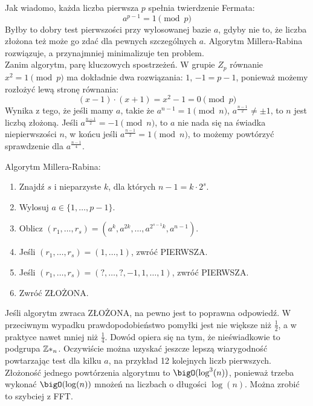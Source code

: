 Jak wiadomo, każda liczba pierwsza \( p \) spełnia twierdzenie Fermata: \[ a^{p-1} = 1 \pmod{p} \] Byłby to dobry test pierwszości przy wylosowanej bazie \( a \), gdyby nie to, że liczba złożona też może go zdać dla pewnych szczególnych \( a \). Algorytm Millera-Rabina rozwiązuje, a przynajmniej minimalizuje ten problem. \\
Zanim algorytm, parę kluczowych spostrzeżeń. W grupie \( Z_p \) równanie \( x^2 = 1 \pmod{p} \) ma dokładnie dwa rozwiązania: \( 1 \), \( -1 = p - 1 \), ponieważ możemy rozłożyć lewą stronę równania: \[ (x-1) \cdot (x+1) = x^2 - 1 = 0 \pmod{p} \] Wynika z tego, że jeśli mamy \( a \), takie że \( a^{n-1} = 1 \pmod{n} \), \( a^{\frac{n-1}{2}} \neq \pm 1 \), to \( n \) jest liczbą złożoną. Jeśli \( a^{\frac{n-1}{2}} = -1 \pmod{n} \), to \( a \) nie nada się na świadka niepierwszości \( n \), w końcu jeśli \( a^{\frac{n-1}{2}} = 1 \pmod{n} \), to możemy powtórzyć sprawdzenie dla \( a^{\frac{n-1}{4}}\).

\begin{greyframe}
    Algorytm Millera-Rabina:
    \begin{enumerate}
        \item Znajdź \( s \) i nieparzyste \( k \), dla których \( n-1 = k \cdot 2^s \).
        \item Wylosuj \( a \in \{1, \dots, p - 1\} \).
        \item Oblicz \( (r_1, \dots, r_s ) = (a^k, a^{2k}, \dots, a^{2^{s-1}k}, a^{n-1}) \).
        \item Jeśli \( (r_1, \dots, r_s) = (1, \dots, 1) \), zwróć PIERWSZA.
        \item Jeśli \( (r_1, \dots, r_s) = (?, \dots, ?, -1, 1, \dots, 1) \), zwróć PIERWSZA.
        \item Zwróć ZŁOŻONA.
    \end{enumerate}
\end{greyframe}
Jeśli algorytm zwraca ZŁOŻONA, na pewno jest to poprawna odpowiedź. W przeciwnym wypadku prawdopodobieństwo pomyłki jest nie większe
niż \( \frac{1}{2} \), a w praktyce nawet mniej niż \( \frac{1}{4} \). Dowód opiera się na tym, że nieświadkowie to podgrupa \( \mathbb{Z}*_n \). Oczywiście można uzyskać jeszcze lepszą wiarygodność powtarzając test dla kilku \( a \), na przykład 12 kolejnych liczb pierwszych. \\
Złożoność jednego powtórzenia algorytmu to \( \bigO(\log^3(n)) \), ponieważ trzeba wykonać \( \bigO(\log(n)) \) mnożeń na liczbach o długości \( \log(n) \). Można zrobić to szybciej z FFT.